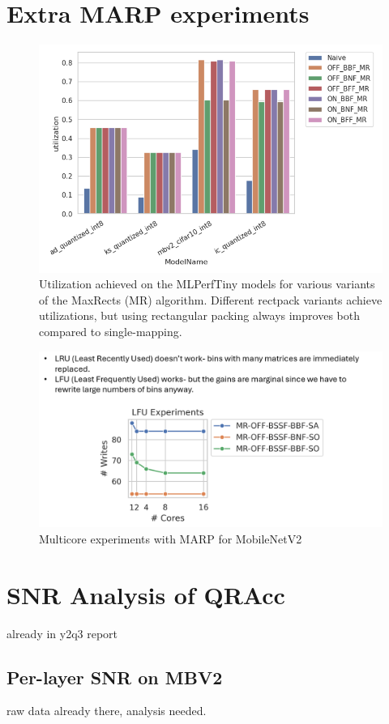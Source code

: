 \section{Extra MARP experiments}
\label{section:appendixextra_marp_experiments}

\begin{figure}[htbp]
    \centering
    \includegraphics[width=\textwidth]{images/appendix/mlperftiny_utilization_vs_packer.png}
    \caption{Utilization achieved on the MLPerfTiny models for various variants of the MaxRects (MR) algorithm. Different rectpack variants achieve utilizations, but using rectangular packing always improves both compared to single-mapping.}
\end{figure}

\begin{figure}[htbp]
    \centering
    \includegraphics[width=\textwidth]{images/appendix/marp_multicore.png}
    \caption{Multicore experiments with MARP for MobileNetV2}
\end{figure}


\section{SNR Analysis of QRAcc}
\label{section:appendixsnr_analysis}

already in y2q3 report

\subsection{Per-layer SNR on MBV2}

raw data already there, analysis needed.